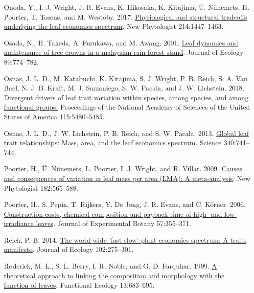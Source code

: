 \documentclass[
  12pt,
]{article}
\newlength{\cslhangindent} %
\newlength{\cslentryspacingunit} %
\newenvironment{CSLReferences}[2] %
 {%
  \setlength{\parindent}{0pt} %
  \ifodd #1 %
  \let\oldpar\par %
  \def\par{\hangindent=\cslhangindent\oldpar} %
  \fi %
  \setlength{\parskip}{#2\cslentryspacingunit} %
 }%
 {} %
\begin{document}
\begin{CSLReferences}{1}{0}
\leavevmode{}%
Onoda, Y., I. J. Wright, J. R. Evans, K. Hikosaka, K. Kitajima, Ü. Niinemets, H. Poorter, T. Tosens, and M. Westoby. 2017. \href{https://doi.org/10.1111/nph.14496}{Physiological and structural tradeoffs underlying the leaf economics spectrum}. New Phytologist 214:1447--1463.

\leavevmode{}%
Osada, N., H. Takeda, A. Furukawa, and M. Awang. 2001. \href{https://doi.org/10.1046/j.0022-0477.2001.00590.x}{Leaf dynamics and maintenance of tree crowns in a malaysian rain forest stand}. Journal of Ecology 89:774--782.

\leavevmode{}%
Osnas, J. L. D., M. Katabuchi, K. Kitajima, S. J. Wright, P. B. Reich, S. A. Van Bael, N. J. B. Kraft, M. J. Samaniego, S. W. Pacala, and J. W. Lichstein. 2018. \href{https://doi.org/10.1073/pnas.1803989115}{Divergent drivers of leaf trait variation within species, among species, and among functional groups.} Proceedings of the National Academy of Sciences of the United States of America 115:5480--5485.

\leavevmode{}%
Osnas, J. L. D., J. W. Lichstein, P. B. Reich, and S. W. Pacala. 2013. \href{https://doi.org/10.1126/science.1231574}{Global leaf trait relationships: {Mass}, area, and the leaf economics spectrum}. Science 340:741--744.

\leavevmode{}%
Poorter, H., Ü. Niinemets, L. Poorter, I. J. Wright, and R. Villar. 2009. \href{https://doi.org/10.1111/j.1469-8137.2009.02830.x}{Causes and consequences of variation in leaf mass per area ({LMA}): {A} meta-analysis}. New Phytologist 182:565--588.

\leavevmode{}%
Poorter, H., S. Pepin, T. Rijkers, Y. De Jong, J. R. Evans, and C. Körner. 2006. \href{https://doi.org/10.1093/jxb/erj002}{Construction costs, chemical composition and payback time of high- and low-irradiance leaves}. Journal of Experimental Botany 57:355--371.

\leavevmode{}%
Reich, P. B. 2014. \href{https://doi.org/10.1111/1365-2745.12211}{The world-wide 'fast-slow' plant economics spectrum: {A} traits manifesto}. Journal of Ecology 102:275--301.

\leavevmode{}%
Roderick, M. L., S. L. Berry, I. R. Noble, and G. D. Farquhar. 1999. \href{https://doi.org/10.1046/j.1365-2435.1999.00368.x}{A theoretical approach to linking the composition and morphology with the function of leaves}. Functional Ecology 13:683--695.


\end{CSLReferences}
\end{document}
